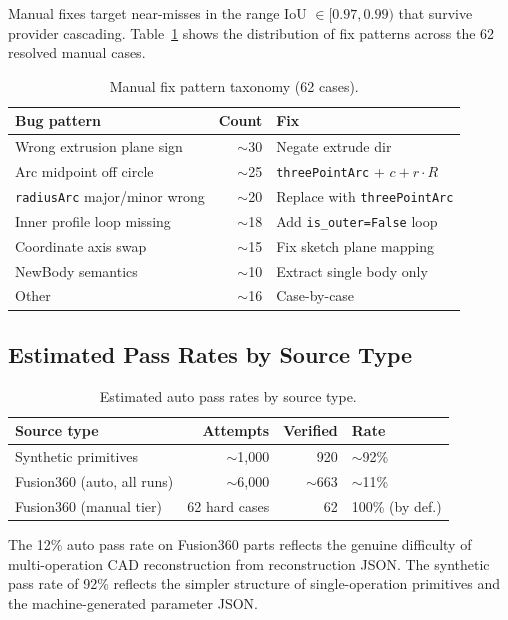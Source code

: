 Manual fixes target near-misses in the range IoU $\in [0.97, 0.99)$ that survive provider cascading. Table~\ref{tab:bugpatterns} shows the distribution of fix patterns across the 62 resolved manual cases.

\begin{table}[h]
\centering
\small
\caption{Manual fix pattern taxonomy (62 cases).}
\label{tab:bugpatterns}
\begin{tabular}{lrl}
\toprule
\textbf{Bug pattern} & \textbf{Count} & \textbf{Fix} \\
\midrule
Wrong extrusion plane sign & $\sim$30 & Negate extrude dir \\
Arc midpoint off circle & $\sim$25 & \texttt{threePointArc} + $c + r\cdot R$ \\
\texttt{radiusArc} major/minor wrong & $\sim$20 & Replace with \texttt{threePointArc} \\
Inner profile loop missing & $\sim$18 & Add \texttt{is\_outer=False} loop \\
Coordinate axis swap & $\sim$15 & Fix sketch plane mapping \\
NewBody semantics & $\sim$10 & Extract single body only \\
Other & $\sim$16 & Case-by-case \\
\bottomrule
\end{tabular}
\end{table}

\subsection{Estimated Pass Rates by Source Type}

\begin{table}[h]
\centering
\small
\caption{Estimated auto pass rates by source type.}
\label{tab:passrates}
\begin{tabular}{lrrl}
\toprule
\textbf{Source type} & \textbf{Attempts} & \textbf{Verified} & \textbf{Rate} \\
\midrule
Synthetic primitives      & $\sim$1,000 &  920  & $\sim$92\% \\
Fusion360 (auto, all runs) & $\sim$6,000 & $\sim$663 & $\sim$11\% \\
Fusion360 (manual tier)   &  62 hard cases &  62 & 100\% (by def.) \\
\bottomrule
\end{tabular}
\end{table}

The 12\% auto pass rate on Fusion360 parts reflects the genuine difficulty of multi-operation CAD reconstruction from reconstruction JSON. The synthetic pass rate of 92\% reflects the simpler structure of single-operation primitives and the machine-generated parameter JSON.

